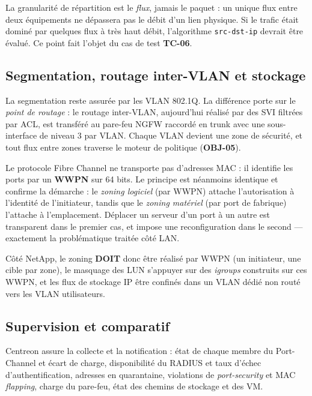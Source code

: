 \documentclass[11pt,a4paper]{article}
\newcommand{\ttb}[1]{\texttt{\small #1}}
\newcommand{\rid}[1]{\textcolor{primary}{\textbf{\small #1}}}
\begin{document}
\begin{alertbox}
La granularité de répartition est le \emph{flux}, jamais le paquet : un unique flux entre deux équipements ne dépassera pas le débit d'un lien physique. Si le trafic était dominé par quelques flux à très haut débit, l'algorithme \ttb{src-dst-ip} devrait être évalué. Ce point fait l'objet du cas de test \rid{TC-06}.
\end{alertbox}

\subsection{Segmentation, routage inter-VLAN et stockage}
La segmentation reste assurée par les VLAN 802.1Q. La différence porte sur le \emph{point de routage} : le routage inter-VLAN, aujourd'hui réalisé par des SVI filtrées par ACL, est transféré au pare-feu NGFW raccordé en trunk avec une sous-interface de niveau 3 par VLAN. Chaque VLAN devient une zone de sécurité, et tout flux entre zones traverse le moteur de politique (\rid{OBJ-05}).

\begin{notebox}
Le protocole Fibre Channel ne transporte pas d'adresses MAC : il identifie les ports par un \textbf{WWPN} sur 64 bits. Le principe est néanmoins identique et confirme la démarche : le \emph{zoning logiciel} (par WWPN) attache l'autorisation à l'identité de l'initiateur, tandis que le \emph{zoning matériel} (par port de fabrique) l'attache à l'emplacement. Déplacer un serveur d'un port à un autre est transparent dans le premier cas, et impose une reconfiguration dans le second --- exactement la problématique traitée côté LAN.
\end{notebox}

Côté NetApp, le zoning \textbf{DOIT} donc être réalisé par WWPN (un initiateur, une cible par zone), le masquage des LUN s'appuyer sur des \textit{igroups} construits sur ces WWPN, et les flux de stockage IP être confinés dans un VLAN dédié non routé vers les VLAN utilisateurs.

\subsection{Supervision et comparatif}
Centreon assure la collecte et la notification : état de chaque membre du Port-Channel et écart de charge, disponibilité du RADIUS et taux d'échec d'authentification, adresses en quarantaine, violations de \textit{port-security} et MAC \textit{flapping}, charge du pare-feu, état des chemins de stockage et des VM.
\end{document}
